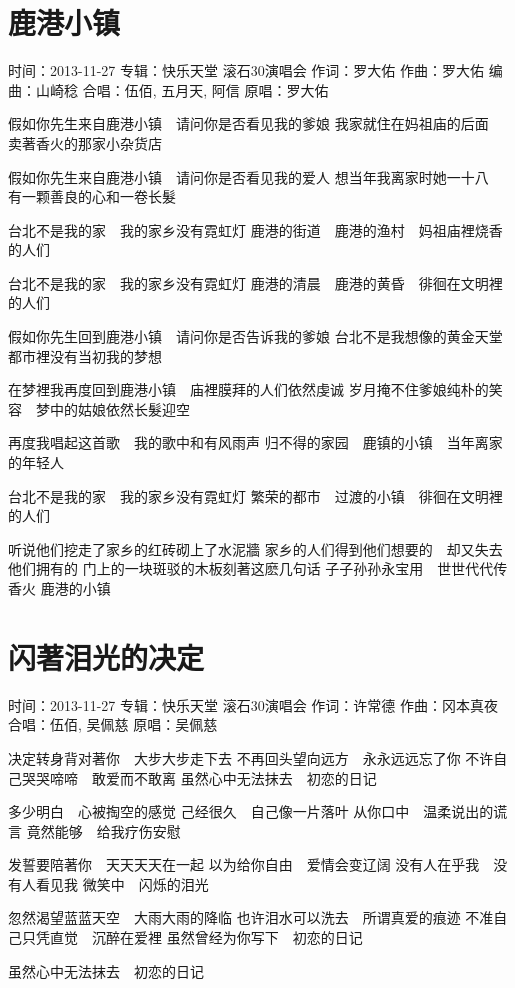 \documentclass[UTF8,a4paper,oneside,twocolumn,12pt]{ctexbook}
\newcommand{\infopair}[2]{\textbullet #1：#2}
\newcommand{\zc}[1][伍佰]{\infopair{作词}{#1}}
\newcommand{\zq}[1][伍佰]{\infopair{作曲}{#1}}
\newcommand{\bq}[1][伍佰]{\infopair{编曲}{#1}}
\newcommand{\zj}[1]{\infopair{专辑}{#1}}
\newcommand{\yc}[1]{\infopair{原唱}{#1}}
\newcommand{\sj}[1]{\infopair{时间}{#1}}
\newenvironment{info}{\begin{flushleft}\kaishu
	}
	{\end{flushleft}\normalsize\yahei\par}
\newenvironment{lyric}{
	}
{}
\begin{document}
\section{鹿港小镇}
\begin{info}
	\sj{2013-11-27}
	\zj{快乐天堂 滚石30演唱会}
	\zc[罗大佑]
	\zq[罗大佑]
	\bq[山崎稔]
	\infopair{合唱}{伍佰, 五月天, 阿信}
	\yc{罗大佑}
\end{info}
\begin{lyric}
	假如你先生来自鹿港小镇　请问你是否看见我的爹娘
	我家就住在妈祖庙的后面　卖著香火的那家小杂货店

	假如你先生来自鹿港小镇　请问你是否看见我的爱人
	想当年我离家时她一十八　有一颗善良的心和一卷长髮

	台北不是我的家　我的家乡没有霓虹灯
	鹿港的街道　鹿港的渔村　妈祖庙裡烧香的人们

	台北不是我的家　我的家乡没有霓虹灯
	鹿港的清晨　鹿港的黄昏　徘徊在文明裡的人们

	假如你先生回到鹿港小镇　请问你是否告诉我的爹娘
	台北不是我想像的黄金天堂　都市裡没有当初我的梦想

	在梦裡我再度回到鹿港小镇　庙裡膜拜的人们依然虔诚
	岁月掩不住爹娘纯朴的笑容　梦中的姑娘依然长髮迎空

	再度我唱起这首歌　我的歌中和有风雨声
	归不得的家园　鹿镇的小镇　当年离家的年轻人

	台北不是我的家　我的家乡没有霓虹灯
	繁荣的都市　过渡的小镇　徘徊在文明裡的人们

	听说他们挖走了家乡的红砖砌上了水泥牆
	家乡的人们得到他们想要的　却又失去他们拥有的
	门上的一块斑驳的木板刻著这麽几句话
	子子孙孙永宝用　世世代代传香火
	鹿港的小镇
\end{lyric}

\section{闪著泪光的决定}
\begin{info}
	\sj{2013-11-27}
	\zj{快乐天堂 滚石30演唱会}
	\zc[许常德]
	\zq[冈本真夜]
	\infopair{合唱}{伍佰, 吴佩慈}
	\yc{吴佩慈}
\end{info}
\begin{lyric}
	决定转身背对著你　大步大步走下去
	不再回头望向远方　永永远远忘了你
	不许自己哭哭啼啼　敢爱而不敢离
	虽然心中无法抹去　初恋的日记

	多少明白　心被掏空的感觉
	己经很久　自己像一片落叶
	从你口中　温柔说出的谎言
	竟然能够　给我疗伤安慰

	发誓要陪著你　天天天天在一起
	以为给你自由　爱情会变辽阔
	没有人在乎我　没有人看见我
	微笑中　闪烁的泪光

	忽然渴望蓝蓝天空　大雨大雨的降临
	也许泪水可以洗去　所谓真爱的痕迹
	不准自己只凭直觉　沉醉在爱裡
	虽然曾经为你写下　初恋的日记

	虽然心中无法抹去　初恋的日记
\end{lyric}
\end{document}

